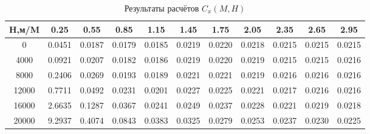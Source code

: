 \begin{table}[H]
\centering
\caption{Результаты расчётов $C_x(M,H)$}
\label{Cx}
\begin{tabular}{|c|c|c|c|c|c|c|c|c|c|c|}
\toprule
H,м/M &    0.25 &    0.55 &    0.85 &    1.15 &    1.45 &    1.75 &    2.05 &    2.35 &    2.65 &    2.95 \\
\midrule
0     &  0.0451 &  0.0187 &  0.0179 &  0.0185 &  0.0219 &  0.0220 &  0.0218 &  0.0215 &  0.0215 &  0.0215 \\
4000  &  0.0921 &  0.0207 &  0.0182 &  0.0186 &  0.0219 &  0.0220 &  0.0219 &  0.0215 &  0.0215 &  0.0216 \\
8000  &  0.2406 &  0.0269 &  0.0193 &  0.0189 &  0.0221 &  0.0221 &  0.0219 &  0.0216 &  0.0216 &  0.0216 \\
12000 &  0.7711 &  0.0492 &  0.0231 &  0.0201 &  0.0227 &  0.0225 &  0.0221 &  0.0217 &  0.0216 &  0.0216 \\
16000 &  2.6635 &  0.1287 &  0.0367 &  0.0241 &  0.0249 &  0.0237 &  0.0228 &  0.0221 &  0.0219 &  0.0218 \\
20000 &  9.2937 &  0.4074 &  0.0843 &  0.0383 &  0.0325 &  0.0279 &  0.0253 &  0.0237 &  0.0230 &  0.0225 \\
\bottomrule
\end{tabular}
\end{table}

